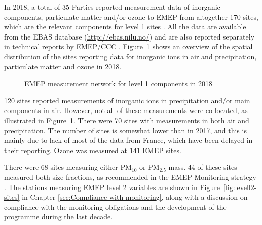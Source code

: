 In 2018, a total of 35 Parties reported measurement data of inorganic components, particulate matter and/or ozone to EMEP from altogether 170 sites, which are the relevant components for level 1 sites \citep{MonStrat2019}. 
All the data are available from the EBAS database (\url{http://ebas.nilu.no/}) and are also reported separately in technical reports by EMEP/CCC \citep{Hjellbrekke2020a,Hjellbrekke2020b}. Figure~\ref{fig:EMEP-measurement-network} shows an overview of the spatial distribution of the sites reporting data for inorganic ions in air and precipitation, particulate matter and ozone in 2018.

\begin{figure}[h!]
 \centering
\caption{\label{fig:EMEP-measurement-network}EMEP measurement network for level 1 components in 2018}
\end{figure}

120 sites reported measurements of inorganic ions in precipitation and/or main components in air. However, not all of these measurements were co-located, as illustrated in Figure~\ref{fig:EMEP-measurement-network}. There were 70 sites with measurements in both air and precipitation. The number of sites is somewhat lower than in 2017, and this is mainly due to lack of most of the data from France, which have been delayed in their reporting. Ozone was measured at 141 EMEP sites.

There were 68 sites measuring either PM$_{10}$ or PM$_{2.5}$ mass. 44 of these sites measured both size fractions, as recommended in the EMEP Monitoring strategy \citep{MonStrat2019}. The stations measuring EMEP level 2 variables are shown in Figure~\ref{fig:levell2-sites} in Chapter \ref{sec:Compliance-with-monitoring}, along with a discussion on compliance with the monitoring obligations and the development of the programme during the last decade.

